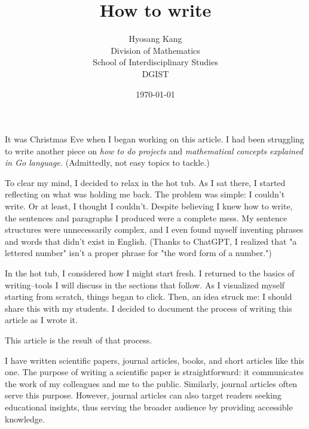 \documentclass[a4paper]{article}
\title{How to write}
\author{
    Hyosang Kang\\
    \small Division of Mathematics\\ 
    \small School of Interdisciplinary Studies\\ 
    \small DGIST
}
\date{\today}
\begin{document}
\maketitle


It was Christmas Eve when I began working on this article. I had been struggling to write another piece on \textit{how to do projects} and \textit{mathematical concepts explained in Go language.} (Admittedly, not easy topics to tackle.)

To clear my mind, I decided to relax in the hot tub. As I sat there, I started reflecting on what was holding me back. The problem was simple: I couldn't write. Or at least, I thought I couldn't. Despite believing I knew how to write, the sentences and paragraphs I produced were a complete mess. My sentence structures were unnecessarily complex, and I even found myself inventing phrases and words that didn't exist in English. (Thanks to ChatGPT, I realized that "a lettered number" isn't a proper phrase for "the word form of a number.")

In the hot tub, I considered how I might start fresh. I returned to the basics of writing--tools I will discuss in the sections that follow. As I visualized myself starting from scratch, things began to click. Then, an idea struck me: I should share this with my students. I decided to document the process of writing this article as I wrote it.

This article is the result of that process.

I have written scientific papers, journal articles, books, and short articles like this one. The purpose of writing a scientific paper is straightforward: it communicates the work of my colleagues and me to the public. Similarly, journal articles often serve this purpose. However, journal articles can also target readers seeking educational insights, thus serving the broader audience by providing accessible knowledge.
\end{document}
